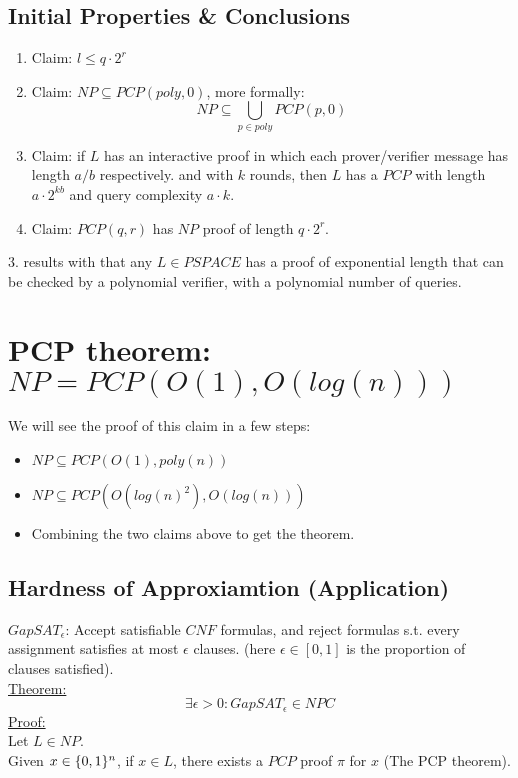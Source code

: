 \subsection*{Initial Properties \& Conclusions}
\begin{enumerate}
	\item
	Claim: $l\leq q\cdot 2^r$
	\item 
	Claim: $NP\subseteq PCP(poly, 0)$, more formally:
	\[
		NP\subseteq \bigcup_{p\in poly}PCP(p,0)	
	\]
	\item
	Claim: if $L$ has an interactive proof in which each prover/verifier message has length $a/b$ respectively.
	and with $k$ rounds, then $L$ has a $PCP$
	with length $a\cdot 2^{kb}$ and query complexity $a\cdot k$.
	\item
	Claim: $PCP(q,r)$ has $NP$ proof of length $q\cdot 2^r$.
\end{enumerate}
3. results with that any $L\in PSPACE$ has a proof
of exponential length that can be checked by a polynomial verifier, with a polynomial
number of queries.

\section*{PCP theorem: $NP = PCP(O(1), O(log(n)))$}
We will see the proof of this claim in a few steps:
\begin{itemize}
	\item $NP \subseteq PCP(O(1), poly(n))$
	\item $NP\subseteq PCP(O(log(n)^2), O(log(n)))$
	\item Combining the two claims above to get the theorem.
\end{itemize}

\subsection*{Hardness of Approxiamtion (Application)}
$GapSAT_\epsilon$: Accept satisfiable $CNF$ formulas,
and reject formulas s.t. every assignment satisfies at most $\epsilon$ clauses.
(here $\epsilon \in[0,1]$ is the proportion of clauses satisfied).\\

\underline{Theorem:}\\
\[
	\exists\epsilon >0: GapSAT_\epsilon\in NPC
\]
\underline{Proof:}\\
Let $L\in NP$.\\
Given $x\in\{0,1\}^n$, if $x\in L$,
there exists a $PCP$ proof $\pi$ for $x$ (The PCP theorem).\\


